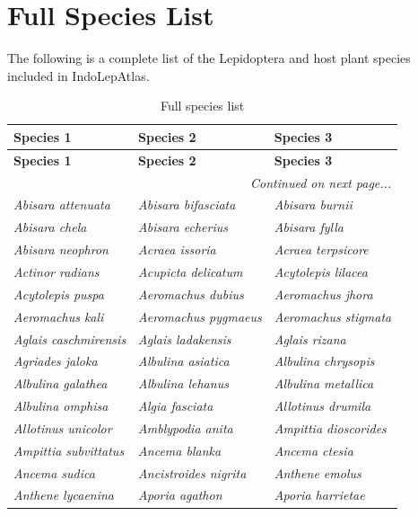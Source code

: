 \documentclass[runningheads]{llncs}
\begin{document}
\section{Full Species List}
The following is a complete list of the Lepidoptera and host plant species included in IndoLepAtlas.
\begin{longtable}{lll}
\caption{Full species list} \label{tab:full_species} \\
\toprule
\textbf{Species 1} & \textbf{Species 2} & \textbf{Species 3} \\
\midrule
\endfirsthead
\toprule
\textbf{Species 1} & \textbf{Species 2} & \textbf{Species 3} \\
\midrule
\endhead
\midrule
\multicolumn{3}{r}{\textit{Continued on next page...}} \\
\endfoot
\bottomrule
\endlastfoot
\textit{Abisara attenuata} & \textit{Abisara bifasciata} & \textit{Abisara burnii} \\
\textit{Abisara chela} & \textit{Abisara echerius} & \textit{Abisara fylla} \\
\textit{Abisara neophron} & \textit{Acraea issoria} & \textit{Acraea terpsicore} \\
\textit{Actinor radians} & \textit{Acupicta delicatum} & \textit{Acytolepis lilacea} \\
\textit{Acytolepis puspa} & \textit{Aeromachus dubius} & \textit{Aeromachus jhora} \\
\textit{Aeromachus kali} & \textit{Aeromachus pygmaeus} & \textit{Aeromachus stigmata} \\
\textit{Aglais caschmirensis} & \textit{Aglais ladakensis} & \textit{Aglais rizana} \\
\textit{Agriades jaloka} & \textit{Albulina asiatica} & \textit{Albulina chrysopis} \\
\textit{Albulina galathea} & \textit{Albulina lehanus} & \textit{Albulina metallica} \\
\textit{Albulina omphisa} & \textit{Algia fasciata} & \textit{Allotinus drumila} \\
\textit{Allotinus unicolor} & \textit{Amblypodia anita} & \textit{Ampittia dioscorides} \\
\textit{Ampittia subvittatus} & \textit{Ancema blanka} & \textit{Ancema ctesia} \\
\textit{Ancema sudica} & \textit{Ancistroides nigrita} & \textit{Anthene emolus} \\
\textit{Anthene lycaenina} & \textit{Aporia agathon} & \textit{Aporia harrietae} \\

\end{longtable}
\end{document}
